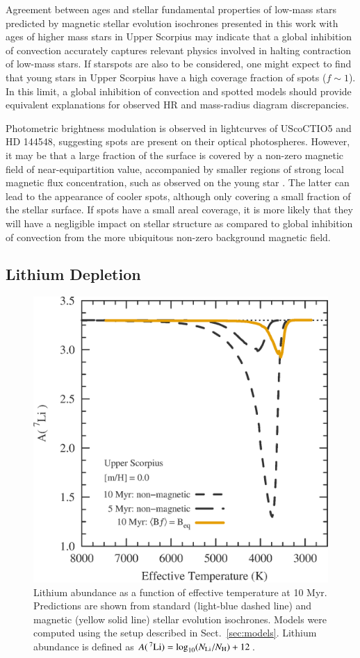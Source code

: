 \documentclass{aa}
\begin{document}
Agreement between ages and stellar fundamental properties of low-mass stars predicted by magnetic stellar evolution isochrones presented in this work with ages of higher mass stars in Upper Scorpius may indicate that a global inhibition of convection accurately captures relevant physics involved in halting contraction of low-mass stars. If starspots are also to be considered, one might expect to find that young stars in Upper Scorpius have a high coverage fraction of spots ($f \sim 1$). In this limit, a global inhibition of convection and spotted models \citep[e.g.,][]{Somers2015b} should provide equivalent explanations for observed HR and mass-radius diagram discrepancies.

Photometric brightness modulation is observed in lightcurves of UScoCTIO5 and HD 144548, suggesting spots are present on their optical photospheres. However, it may be that a large fraction of the surface is covered by a non-zero magnetic field of near-equipartition value, accompanied by smaller regions of strong local magnetic flux concentration, such as observed on the young star  \citep{Shulyak2014}. The latter can lead to the appearance of cooler spots, although only covering a small fraction of the stellar surface. If spots have a small areal coverage, it is more likely that they will have a negligible impact on stellar structure as compared to global inhibition of convection from the more ubiquitous non-zero background magnetic field.

\subsection{Lithium Depletion}


\begin{figure}[t]
    \includegraphics[width=0.85\linewidth]{Li7_USco_Beq.eps}
    \caption{Lithium abundance  as a function of effective temperature at 10 Myr. Predictions are shown from standard (light-blue dashed line) and magnetic (yellow solid line) stellar evolution isochrones. Models were computed using the setup described in Sect.~\ref{sec:models}. Lithium abundance is defined as $A(\,^7{\rm Li}) = \log_{10}(N_{\rm Li}/N_{\rm H}) + 12$.}
    \label{fig:lithium}
\end{figure}
\end{document}
